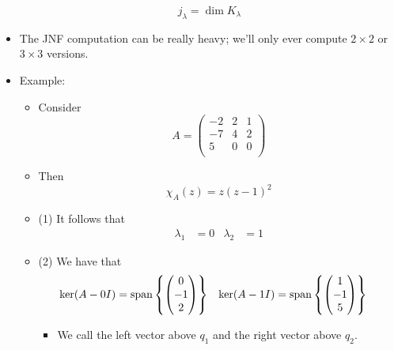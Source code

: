 \documentclass[../notes.tex]{subfiles}
\begin{document}
\begin{itemize}
    \begin{equation*}
        j_\lambda = \dim K_\lambda
    \end{equation*}
    \item The JNF computation can be really heavy; we'll only ever compute $2\times 2$ or $3\times 3$ versions.
    \item Example:
    \begin{itemize}
        \item Consider
        \begin{equation*}
            A =
            \begin{pmatrix}
                -2 & 2 & 1\\
                -7 & 4 & 2\\
                5 & 0 & 0\\
            \end{pmatrix}
        \end{equation*}
        \item Then
        \begin{equation*}
            \chi_A(z) = z(z-1)^2
        \end{equation*}
        \item (1) It follows that
        \begin{align*}
            \lambda_1 &= 0&
            \lambda_2 &= 1
        \end{align*}
        \item (2) We have that
        \begin{align*}
            \ker(A-0I) &= \operatorname{span}\left\{
                \begin{pmatrix}
                    0\\
                    -1\\
                    2\\
                \end{pmatrix}
            \right\}&
            \ker(A-1I) &= \operatorname{span}\left\{
                \begin{pmatrix}
                    1\\
                    -1\\
                    5\\
                \end{pmatrix}
            \right\}
        \end{align*}
        \begin{itemize}
            \item We call the left vector above $q_1$ and the right vector above $q_2$.

\end{itemize}
\end{itemize}
\end{itemize}
\end{document}
